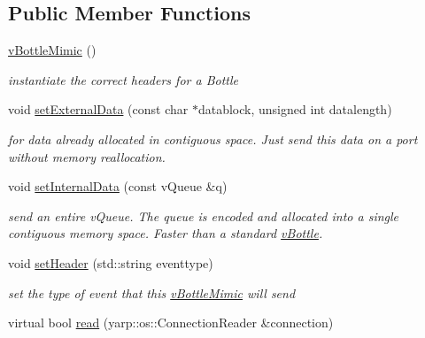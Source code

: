 \subsection*{Public Member Functions}
\begin{DoxyCompactItemize}
\item 
\hyperlink{classev_1_1vBottleMimic_ae7a95df35d75378e949ceff50d169ddf}{v\+Bottle\+Mimic} ()\hypertarget{classev_1_1vBottleMimic_ae7a95df35d75378e949ceff50d169ddf}{}\label{classev_1_1vBottleMimic_ae7a95df35d75378e949ceff50d169ddf}

\begin{DoxyCompactList}\small\item\em instantiate the correct headers for a Bottle \end{DoxyCompactList}\item 
void \hyperlink{classev_1_1vBottleMimic_ac3e34609dfb06ed5c10509741751c053}{set\+External\+Data} (const char $\ast$datablock, unsigned int datalength)\hypertarget{classev_1_1vBottleMimic_ac3e34609dfb06ed5c10509741751c053}{}\label{classev_1_1vBottleMimic_ac3e34609dfb06ed5c10509741751c053}

\begin{DoxyCompactList}\small\item\em for data already allocated in contiguous space. Just send this data on a port without memory reallocation. \end{DoxyCompactList}\item 
void \hyperlink{classev_1_1vBottleMimic_ae32460f8fb474c394171f783d9e4aba1}{set\+Internal\+Data} (const v\+Queue \&q)\hypertarget{classev_1_1vBottleMimic_ae32460f8fb474c394171f783d9e4aba1}{}\label{classev_1_1vBottleMimic_ae32460f8fb474c394171f783d9e4aba1}

\begin{DoxyCompactList}\small\item\em send an entire v\+Queue. The queue is encoded and allocated into a single contiguous memory space. Faster than a standard \hyperlink{classev_1_1vBottle}{v\+Bottle}. \end{DoxyCompactList}\item 
void \hyperlink{classev_1_1vBottleMimic_ac0f5995820702df0aea2ede33d65cace}{set\+Header} (std\+::string eventtype)\hypertarget{classev_1_1vBottleMimic_ac0f5995820702df0aea2ede33d65cace}{}\label{classev_1_1vBottleMimic_ac0f5995820702df0aea2ede33d65cace}

\begin{DoxyCompactList}\small\item\em set the type of event that this \hyperlink{classev_1_1vBottleMimic}{v\+Bottle\+Mimic} will send \end{DoxyCompactList}\item 
virtual bool \hyperlink{classev_1_1vBottleMimic_a5c7ead7b0484b9abe99e922196c074ff}{read} (yarp\+::os\+::\+Connection\+Reader \&connection)\hypertarget{classev_1_1vBottleMimic_a5c7ead7b0484b9abe99e922196c074ff}{}\label{classev_1_1vBottleMimic_a5c7ead7b0484b9abe99e922196c074ff}


\end{DoxyCompactItemize}
